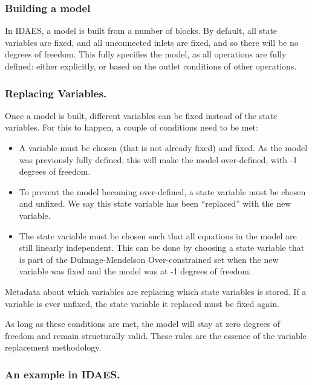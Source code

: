 \hypertarget{building-a-model}{%
\subsubsection{Building a model}\label{building-a-model}}

In IDAES, a model is built from a number of blocks. By default, all
state variables are fixed, and all unconnected inlets are fixed, and so
there will be no degrees of freedom. This fully specifies the model, as
all operations are fully defined: either explicitly, or based on the
outlet conditions of other operations.

\hypertarget{replacing-variables.}{%
\subsubsection{Replacing Variables.}\label{replacing-variables.}}

Once a model is built, different variables can be fixed instead of the
state variables. For this to happen, a couple of conditions need to be
met:

\begin{itemize}
\tightlist
\item
  A variable must be chosen (that is not already fixed) and fixed. As
  the model was previously fully defined, this will make the model
  over-defined, with -1 degrees of freedom.
\item
  To prevent the model becoming over-defined, a state variable must be
  chosen and unfixed. We say this state variable has been ``replaced''
  with the new variable.
\item
  The state variable must be chosen such that all equations in the model
  are still linearly independent. This can be done by choosing a state
  variable that is part of the Dulmage-Mendelson Over-constrained set
  when the new variable was fixed and the model was at -1 degrees of
  freedom.
\end{itemize}

Metadata about which variables are replacing which state variables is
stored. If a variable is ever unfixed, the state variable it replaced
must be fixed again.

As long as these conditions are met, the model will stay at zero degrees
of freedom and remain structurally valid. These rules are the essence of
the variable replacement methodology.

\hypertarget{an-example-in-idaes.}{%
\subsubsection{An example in IDAES.}\label{an-example-in-idaes.}}

